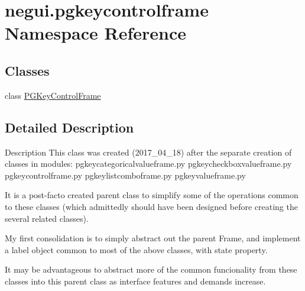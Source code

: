 \hypertarget{namespacenegui_1_1pgkeycontrolframe}{}\section{negui.\+pgkeycontrolframe Namespace Reference}
\label{namespacenegui_1_1pgkeycontrolframe}
\subsection*{Classes}
\begin{DoxyCompactItemize}
\item 
class \hyperlink{classnegui_1_1pgkeycontrolframe_1_1PGKeyControlFrame}{P\+G\+Key\+Control\+Frame}
\end{DoxyCompactItemize}


\subsection{Detailed Description}
\begin{DoxyVerb}Description
This class was created (2017_04_18)
after the separate creation of classes in modules:
    pgkeycategoricalvalueframe.py
    pgkeycheckboxvalueframe.py
    pgkeycontrolframe.py
    pgkeylistcomboframe.py
    pgkeyvalueframe.py

It is a post-facto created parent class to simplify some of the
operations common to these classes (which admittedly should have been
designed before creating the several related classes).

My first consolidation is to simply abstract out the parent Frame, and
implement a label object common to most of the above classes, with
state property.

It may be advantageous to abstract more of the common funcionality from 
these classes into this parent class as interface features and demands
increase.
\end{DoxyVerb}
 